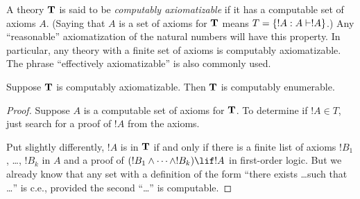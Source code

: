 \documentclass[../../../include/open-logic-section]{subfiles}
\begin{document}


A theory $\mathbf{T}$ is said to be {\em computably axiomatizable} if it has a
computable set of axioms $A$. (Saying that $A$ is a set of axioms for
$\mathbf{T}$ means $T = \Setabs{!A}{A \Proves !A}$.) Any ``reasonable''
axiomatization of the natural numbers will have this property. In
particular, any theory with a finite set of axioms is computably
axiomatizable. The phrase ``effectively axiomatizable'' is also
commonly used.

\begin{lem}
Suppose $\mathbf{T}$ is computably axiomatizable. Then $\mathbf{T}$ is computably
enumerable.
\end{lem}

\begin{proof}
Suppose $A$ is a computable set of axioms for $\mathbf{T}$. To determine
if $!A \in T$, just search for a proof of $!A$ from the axioms.

Put slightly differently, $!A$ is in $\mathbf{T}$ if and only if there is
a finite list of axioms $!B_1$, \dots, $!B_k$ in $A$ and a proof of
$(!B_1 \land \dots \land !B_k) \lif !A$ in first-order logic.  But
we already know that any set with a definition of the form ``there
exists \dots such that \dots'' is c.e., provided the second ``\dots''
is computable.
\end{proof}
\end{document}
